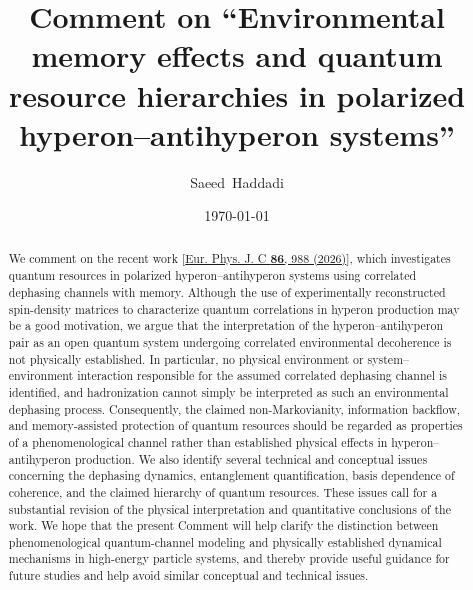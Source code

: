 \documentclass[epjc,twocolumn,nofootinbib,preprintnumbers,amsmath,amssymb]{revtex4-2}
\begin{document}
\title{
Comment on ``Environmental memory effects and quantum resource hierarchies in polarized hyperon--antihyperon systems''
}

\author{Saeed~Haddadi}

\date{\today}

\begin{abstract}
We comment on the recent work [\href{https://doi.org/10.1140/epjc/s10052-026-16247-1}{Eur. Phys. J. C {\bf 86}, 988 (2026)}], which investigates quantum
resources in polarized hyperon--antihyperon systems using correlated
dephasing channels with memory. Although the use of experimentally reconstructed
spin-density matrices to characterize quantum correlations in hyperon
production may be a good motivation, we argue that the interpretation of the
hyperon--antihyperon pair as an open quantum system undergoing correlated
environmental decoherence is not physically established. In particular, no
physical environment or system--environment interaction responsible for the
assumed correlated dephasing channel is identified, and hadronization cannot
simply be interpreted as such an environmental dephasing process. Consequently,
the claimed non-Markovianity, information backflow, and memory-assisted
protection of quantum resources should be regarded as properties of a
phenomenological channel rather than established physical effects in
hyperon--antihyperon production. We also identify several technical and conceptual issues concerning the dephasing dynamics, entanglement quantification, basis dependence of coherence, and the claimed hierarchy of quantum resources. These issues call for a substantial revision of the
physical interpretation and quantitative conclusions of the work. We hope
that the present Comment will help clarify the distinction between
phenomenological quantum-channel modeling and physically established
dynamical mechanisms in high-energy particle systems, and thereby provide
useful guidance for future studies and help avoid similar conceptual and
technical issues.
\end{abstract}

\maketitle
\end{document}
